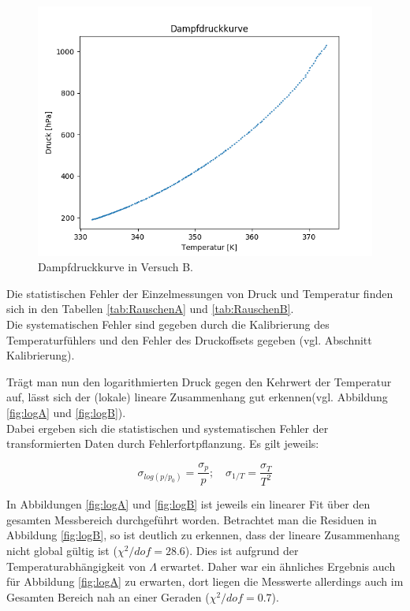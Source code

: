 \documentclass[12pt,a4paper]{article}
\begin{document}
\begin{figure}[H]
\begin{center}
\includegraphics[width=0.8\linewidth]{Bilder/DampfdruckkurveB}
\caption[Dampfdruckkurve B]{Dampfdruckkurve in Versuch B.}
\label{fig:DampfB}
\end{center}
\end{figure}


Die statistischen Fehler der Einzelmessungen von Druck und Temperatur finden sich in den Tabellen \ref{tab:RauschenA} und \ref{tab:RauschenB}.\\
Die systematischen Fehler sind gegeben durch die Kalibrierung des Temperaturfühlers und den Fehler des Druckoffsets gegeben (vgl. Abschnitt Kalibrierung).

Trägt man nun den logarithmierten Druck gegen den Kehrwert der Temperatur auf, lässt sich der (lokale) lineare Zusammenhang gut erkennen(vgl. Abbildung \ref{fig:logA} und \ref{fig:logB}).\\

Dabei ergeben sich die statistischen und systematischen Fehler der transformierten Daten durch Fehlerfortpflanzung. Es gilt jeweils:

\begin{equation}
\sigma_{log(p/p_0)}=\frac{\sigma_p}{p} ; \quad \sigma_{1/T}=\frac{\sigma_T}{T^2}
\end{equation}

In Abbildungen \ref{fig:logA} und \ref{fig:logB} ist jeweils ein linearer Fit über den gesamten Messbereich durchgeführt worden. Betrachtet man die Residuen in Abbildung \ref{fig:logB}, so ist deutlich zu erkennen, dass der lineare Zusammenhang nicht global gültig ist ($\chi^2/dof = 28.6$). Dies ist aufgrund der Temperaturabhängigkeit von $\Lambda$ erwartet. Daher war ein ähnliches Ergebnis auch für Abbildung \ref{fig:logA} zu erwarten, dort liegen die Messwerte allerdings auch im Gesamten Bereich nah an einer Geraden ($\chi^2/dof = 0.7$).
\end{document}
